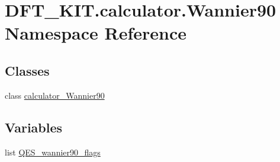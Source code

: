 \hypertarget{namespace_d_f_t___k_i_t_1_1calculator_1_1_wannier90}{\section{D\+F\+T\+\_\+\+K\+I\+T.\+calculator.\+Wannier90 Namespace Reference}
\label{namespace_d_f_t___k_i_t_1_1calculator_1_1_wannier90}
}
\subsection*{Classes}
\begin{DoxyCompactItemize}
\item 
class \hyperlink{class_d_f_t___k_i_t_1_1calculator_1_1_wannier90_1_1calculator___wannier90}{calculator\+\_\+\+Wannier90}
\end{DoxyCompactItemize}
\subsection*{Variables}
\begin{DoxyCompactItemize}
\item 
list \hyperlink{namespace_d_f_t___k_i_t_1_1calculator_1_1_wannier90_ad9950007869589842f2abe7f2c75b877}{Q\+E\+S\+\_\+wannier90\+\_\+flags}
\end{DoxyCompactItemize}


